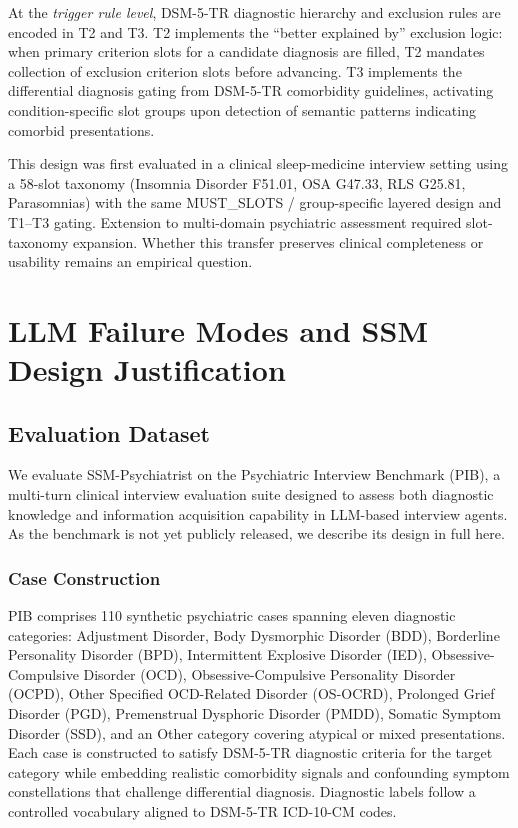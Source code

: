 \documentclass[conference]{IEEEtran}
\begin{document}
At the \textit{trigger rule level}, DSM-5-TR diagnostic hierarchy and exclusion rules are encoded in T2 and T3. T2 implements the ``better explained by'' exclusion logic: when primary criterion slots for a candidate diagnosis are filled, T2 mandates collection of exclusion criterion slots before advancing. T3 implements the differential diagnosis gating from DSM-5-TR comorbidity guidelines, activating condition-specific slot groups upon detection of semantic patterns indicating comorbid presentations.

This design was first evaluated in a clinical sleep-medicine interview setting using a 58-slot taxonomy (Insomnia Disorder F51.01, OSA G47.33, RLS G25.81, Parasomnias) with the same MUST\_SLOTS / group-specific layered design and T1--T3 gating. Extension to multi-domain psychiatric assessment required slot-taxonomy expansion. Whether this transfer preserves clinical completeness or usability remains an empirical question.



\section{LLM Failure Modes and SSM Design Justification}
\label{sec:failuremodes}

\subsection{Evaluation Dataset}
\label{sec:dataset}

We evaluate SSM-Psychiatrist on the Psychiatric Interview Benchmark (PIB), a multi-turn clinical interview evaluation suite designed to assess both diagnostic knowledge and information acquisition capability in LLM-based interview agents. As the benchmark is not yet publicly released, we describe its design in full here.

\subsubsection{Case Construction}

PIB comprises 110 synthetic psychiatric cases spanning eleven diagnostic categories: Adjustment Disorder, Body Dysmorphic Disorder (BDD), Borderline Personality Disorder (BPD), Intermittent Explosive Disorder (IED), Obsessive-Compulsive Disorder (OCD), Obsessive-Compulsive Personality Disorder (OCPD), Other Specified OCD-Related Disorder (OS-OCRD), Prolonged Grief Disorder (PGD), Premenstrual Dysphoric Disorder (PMDD), Somatic Symptom Disorder (SSD), and an Other category covering atypical or mixed presentations. Each case is constructed to satisfy DSM-5-TR diagnostic criteria for the target category while embedding realistic comorbidity signals and confounding symptom constellations that challenge differential diagnosis. Diagnostic labels follow a controlled vocabulary aligned to DSM-5-TR ICD-10-CM codes.
\end{document}
